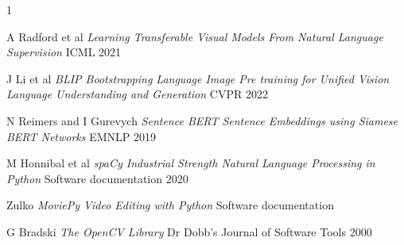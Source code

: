 \documentclass[conference,compsoc]{IEEEtran}
\begin{document}
\begin{thebibliography}{1}

A Radford et al
\emph{Learning Transferable Visual Models From Natural Language Supervision}
ICML 2021

J Li et al
\emph{BLIP Bootstrapping Language Image Pre training for Unified Vision Language Understanding and Generation}
CVPR 2022

N Reimers and I Gurevych
\emph{Sentence BERT Sentence Embeddings using Siamese BERT Networks}
EMNLP 2019

M Honnibal et al
\emph{spaCy Industrial Strength Natural Language Processing in Python}
Software documentation 2020

Zulko
\emph{MoviePy Video Editing with Python}
Software documentation

G Bradski
\emph{The OpenCV Library}
Dr Dobb's Journal of Software Tools 2000

\end{thebibliography}
\end{document}
